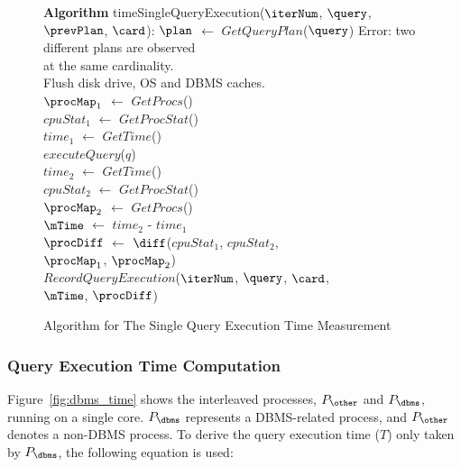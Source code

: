 \begin{figure}[t]
\begin{center}
\begin{algorithmic}
{\bf Algorithm} timeSingleQueryExecution($\iterNum$, $\query$, \\
						\hspace{44.0mm}$\prevPlan$, $\card$):
\STATE $\plan$ $\leftarrow$ $GetQueryPlan$($\query$)
\IF{$\plan$ $\neq$ $\prevPlan$}
	\STATE Error: two different plans are observed \\ 
	at the same cardinality. \\
\ENDIF
\STATE Flush disk drive, OS and DBMS caches. \\
\STATE $\procMap_{1}$ $\leftarrow$ $GetProcs$() \\
\STATE $cpuStat_{1}$ $\leftarrow$ $GetProcStat$() \\
\STATE $time_{1}$ $\leftarrow$ $GetTime$() \\
\STATE $executeQuery$($q$) \\ 
\STATE $time_{2}$ $\leftarrow$ $GetTime$() \\	
\STATE $cpuStat_{2}$ $\leftarrow$ $GetProcStat$() \\
\STATE $\procMap_{2}$ $\leftarrow$ $GetProcs$() \\
\STATE $\mTime$ $\leftarrow$ $time_{2}$ - $time_{1}$ \\	
\STATE $\procDiff$ $\leftarrow$ $\diff$($cpuStat_{1}$, $cpuStat_{2}$, \\
\hspace{22.0mm}							$\procMap_{1}$, $\procMap_{2}$) \\	
\STATE $RecordQueryExecution$($\iterNum$, $\query$, $\card$, \\ 
			\hspace{35.0mm}$\mTime$, $\procDiff$) \\
\end{algorithmic}
\caption{Algorithm for The Single Query Execution Time Measurement\label{alg:exeSpecExp}}
\end{center}
\end{figure}

\subsubsection{Query Execution Time Computation}\label{sec:qe_time}

Figure~\ref{fig:dbms_time} shows the interleaved processes, 
$P_{\other}$ and $P_{\dbms}$, running on a single core. 
$P_{\dbms}$ represents a DBMS-related process, and $P_{\other}$ 
denotes a non-DBMS process. 
To derive the query execution time ($T$) only taken by $P_{\dbms}$, 
the following equation is used: 

